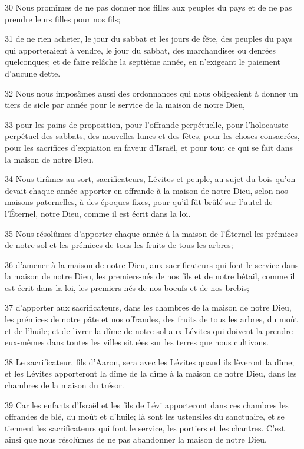 \par 30 Nous promîmes de ne pas donner nos filles aux peuples du pays et de ne pas prendre leurs filles pour nos fils;
\par 31 de ne rien acheter, le jour du sabbat et les jours de fête, des peuples du pays qui apporteraient à vendre, le jour du sabbat, des marchandises ou denrées quelconques; et de faire relâche la septième année, en n'exigeant le paiement d'aucune dette.
\par 32 Nous nous imposâmes aussi des ordonnances qui nous obligeaient à donner un tiers de sicle par année pour le service de la maison de notre Dieu,
\par 33 pour les pains de proposition, pour l'offrande perpétuelle, pour l'holocauste perpétuel des sabbats, des nouvelles lunes et des fêtes, pour les choses consacrées, pour les sacrifices d'expiation en faveur d'Israël, et pour tout ce qui se fait dans la maison de notre Dieu.
\par 34 Nous tirâmes au sort, sacrificateurs, Lévites et peuple, au sujet du bois qu'on devait chaque année apporter en offrande à la maison de notre Dieu, selon nos maisons paternelles, à des époques fixes, pour qu'il fût brûlé sur l'autel de l'Éternel, notre Dieu, comme il est écrit dans la loi.
\par 35 Nous résolûmes d'apporter chaque année à la maison de l'Éternel les prémices de notre sol et les prémices de tous les fruits de tous les arbres;
\par 36 d'amener à la maison de notre Dieu, aux sacrificateurs qui font le service dans la maison de notre Dieu, les premiers-nés de nos fils et de notre bétail, comme il est écrit dans la loi, les premiers-nés de nos boeufs et de nos brebis;
\par 37 d'apporter aux sacrificateurs, dans les chambres de la maison de notre Dieu, les prémices de notre pâte et nos offrandes, des fruits de tous les arbres, du moût et de l'huile; et de livrer la dîme de notre sol aux Lévites qui doivent la prendre eux-mêmes dans toutes les villes situées sur les terres que nous cultivons.
\par 38 Le sacrificateur, fils d'Aaron, sera avec les Lévites quand ils lèveront la dîme; et les Lévites apporteront la dîme de la dîme à la maison de notre Dieu, dans les chambres de la maison du trésor.
\par 39 Car les enfants d'Israël et les fils de Lévi apporteront dans ces chambres les offrandes de blé, du moût et d'huile; là sont les ustensiles du sanctuaire, et se tiennent les sacrificateurs qui font le service, les portiers et les chantres. C'est ainsi que nous résolûmes de ne pas abandonner la maison de notre Dieu.

